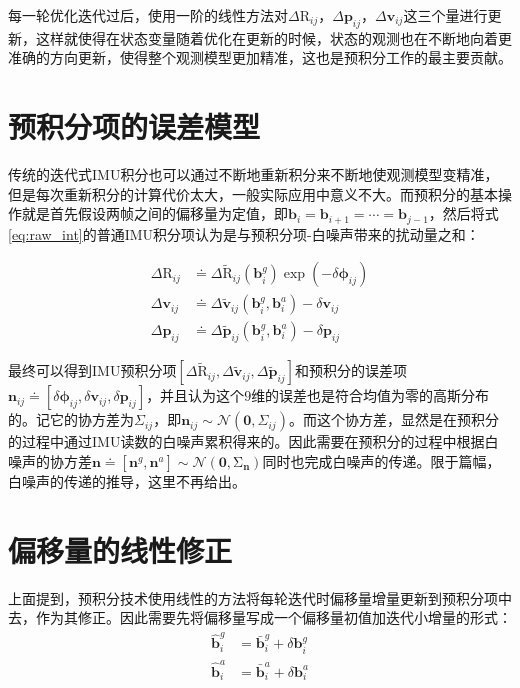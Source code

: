 每一轮优化迭代过后，使用一阶的线性方法对$\Delta\mathrm{R}_{ij}$，$\Delta\bm{p}_{ij}$，$\Delta\bm{v}_{ij}$这三个量进行更新，这样就使得在状态变量随着优化在更新的时候，状态的观测也在不断地向着更准确的方向更新，使得整个观测模型更加精准，这也是预积分工作的最主要贡献。

\section{预积分项的误差模型}

传统的迭代式IMU积分也可以通过不断地重新积分来不断地使观测模型变精准，但是每次重新积分的计算代价太大，一般实际应用中意义不大。而预积分的基本操作就是首先假设两帧之间的偏移量为定值，即$\bm{b}_i = \bm{b}_{i+1} = \cdots = \bm{b}_{j-1}$，然后将式\eqref{eq:raw_int}的普通IMU积分项认为是与预积分项-白噪声带来的扰动量之和：

\begin{equation}
\begin{aligned}
    \Delta\mathrm{R}_{ij} &\doteq
        \Delta\tilde{\mathrm R}_{ij}(\bm{b}^g_i) \exp(-\delta\bm\phi_{ij}) \\
    \Delta\bm{v}_{ij} &\doteq
        \Delta\tilde{\bm v}_{ij}(\bm{b}^g_i, \bm{b}^a_i) - \delta\bm{v}_{ij} \\
    \Delta\bm{p}_{ij} &\doteq
        \Delta\tilde{\bm p}_{ij}(\bm{b}^g_i, \bm{b}^a_i) - \delta\bm{p}_{ij}
\end{aligned}
\end{equation}

最终可以得到IMU预积分项$\left[\Delta\tilde{\mathrm R}_{ij},\Delta\tilde{\bm v}_{ij},\Delta\tilde{\bm p}_{ij}\right]$和预积分的误差项$\bm{n}_{ij} \doteq \left[\delta\bm\phi_{ij},\delta\bm{v}_{ij},\delta\bm{p}_{ij}\right]$，并且认为这个$9$维的误差也是符合均值为零的高斯分布的。记它的协方差为$\Sigma_{ij}$，即$\bm{n}_{ij} \sim \mathcal{N}\left(\bm{0},\Sigma_{ij}\right)$。而这个协方差，显然是在预积分的过程中通过IMU读数的白噪声累积得来的。因此需要在预积分的过程中根据白噪声的协方差$\bm{n} \doteq \left[\bm{n}^g,\bm{n}^a\right] \sim \mathcal{N}(\bm{0},\mathrm\Sigma_{\bm{n}})$同时也完成白噪声的传递。限于篇幅，白噪声的传递的推导，这里不再给出。

\section{偏移量的线性修正}

上面提到，预积分技术使用线性的方法将每轮迭代时偏移量增量更新到预积分项中去，作为其修正。因此需要先将偏移量写成一个偏移量初值加迭代小增量的形式：
\begin{equation}
\begin{aligned}
    \hat{\bm b}^g_i &= \bar{\bm b}^g_i + \delta\bm{b}^g_i \\
    \hat{\bm b}^a_i &= \bar{\bm b}^a_i + \delta\bm{b}^a_i
\end{aligned}
\end{equation}

